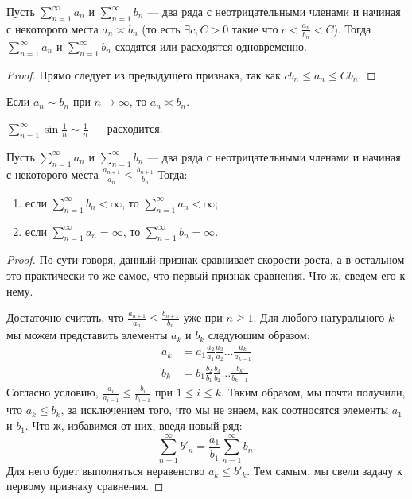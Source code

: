 \documentclass[a4paper, 12pt]{article}
\begin{document}
\begin{Test}
	Пусть $\sum\limits_{n=1}^{\infty} a_n$ и $\sum\limits_{n=1}^{\infty} b_n$ --- два ряда с неотрицательными членами и начиная с некоторого места $a_n \asymp b_n$ (то есть $\exists c, C> 0 $ такие что $c < \frac{a_n}{b_n}<C$). Тогда $\sum\limits_{n=1}^{\infty} a_n$ и $\sum\limits_{n=1}^{\infty} b_n$ сходятся или расходятся одновременно.
\end{Test}

\begin{proof}
	Прямо следует из предыдущего признака, так как $ cb_n \leqslant a_n\leqslant Cb_n$. 
\end{proof}
\begin{Comment}
	Если $a_n \sim b_n$ при $n \rightarrow \infty$, то $a_n \asymp b_n$.
\end{Comment}
\begin{Examples}[тривиальный]
	$\sum\limits_{n=1}^{\infty} \sin\frac{1}{n} \sim \frac{1}{n}$ --- расходится.
\end{Examples}

\begin{Test}
	Пусть $\sum\limits_{n=1}^{\infty} a_n$ и $\sum\limits_{n=1}^{\infty} b_n$ --- два ряда с неотрицательными членами и начиная с некоторого места $\frac{a_{n+1}}{a_n} \leqslant \frac{b_{n+1}}{b_n}$ Тогда: \begin{enumerate}
		\item если $\sum\limits_{n=1}^{\infty} b_n < \infty$, то $\sum\limits_{n=1}^{\infty} a_n < \infty$;
		\item если $\sum\limits_{n=1}^{\infty} a_n = \infty$, то $\sum\limits_{n=1}^{\infty} b_n = \infty$. 
	\end{enumerate}
\end{Test}
\begin{proof}
	По сути говоря, данный признак сравнивает скорости роста, а в остальном это практически то же самое, что первый признак сравнения. Что ж, сведем его к нему.
	
	Достаточно считать, что $\frac{a_{n+1}}{a_n} \leqslant \frac{b_{n+1}}{b_n}$ уже при $n \ge 1$. Для любого натурального $k$ мы можем представить элементы $a_k$ и $b_k$ следующим образом:
	\begin{align*}
	a_k &= a_1 \frac{a_2}{a_1}\frac{a_3}{a_2} \ldots \frac{a_k}{a_{k-1}} \\
	b_k &= b_1 \frac{b_2}{b_1}\frac{b_3}{b_2} \ldots \frac{b_k}{b_{k-1}}
	\end{align*}
	Согласно условию, $\frac{a_{i}}{a_{i-1}} \le \frac{b_i}{b_{i-1}}$ при $1 \le i \le k$. Таким образом, мы почти получили, что $a_k \le b_k$, за исключением того, что мы не знаем, как соотносятся элементы $a_1$ и $b_1$. Что ж, избавимся от них, введя новый ряд:
	$$
	\sum\limits_{n=1}^{\infty} b'_n = \frac{a_1}{b_1}\sum\limits_{n=1}^{\infty}b_n.
	$$ 
	Для него будет выполняться неравенство $a_k \le b'_k$. Тем самым, мы свели задачу к первому признаку сравнения.
\end{proof}
\end{document}
